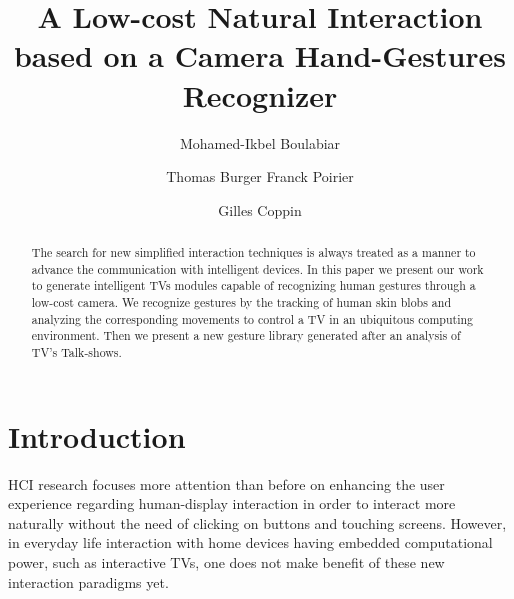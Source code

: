 \documentclass{llncs}
\newcommand\ignore[1]{}
\begin{document}
\frontmatter          %
\pagestyle{headings}  %
\mainmatter              %
%
\title{A Low-cost Natural Interaction based on a Camera Hand-Gestures Recognizer}
\author{Mohamed-Ikbel Boulabiar \and Thomas Burger
Franck Poirier \and Gilles Coppin}
%

\maketitle

\begin{abstract}
The search for new simplified interaction techniques is always treated as a
manner to advance the communication with intelligent devices.
In this paper we present our work to generate intelligent TVs modules capable of
recognizing human gestures through a low-cost camera.
We recognize gestures by the tracking of human skin blobs and analyzing the 
corresponding movements to control a TV in an ubiquitous computing environment.
Then we present a new gesture library generated after an analysis of TV's Talk-shows.

\ignore{
The abstract should summarize the contents of the paper
using at least 70 and at most 150 words. It will be set in 9-point
font size and be inset 1.0 cm from the right and left margins.
There will be two blank lines before and after the Abstract. \dots
}
\end{abstract}
%

\section{Introduction}
HCI research focuses more attention than before on enhancing the user experience regarding human-display interaction in order to interact more naturally without the need of clicking on buttons and touching screens. However, in everyday life interaction with home devices having embedded computational power, such as interactive TVs, one does not make benefit of these new interaction paradigms yet. 
\end{document}
